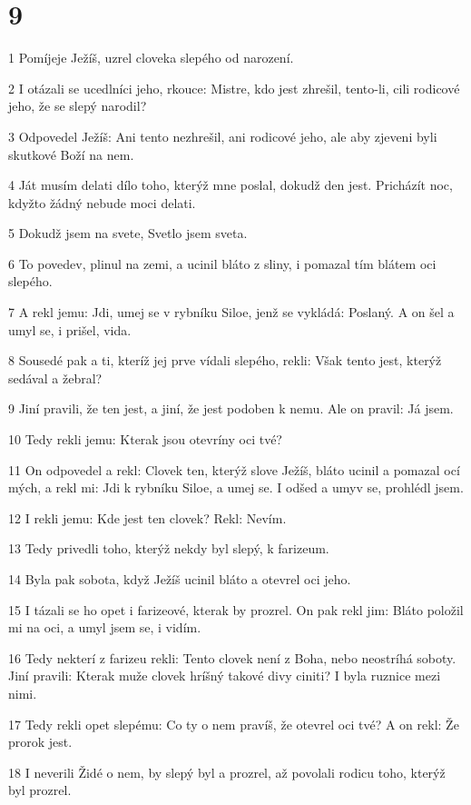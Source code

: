 \chapter{9}

\par 1 Pomíjeje Ježíš, uzrel cloveka slepého od narození.
\par 2 I otázali se ucedlníci jeho, rkouce: Mistre, kdo jest zhrešil, tento-li, cili rodicové jeho, že se slepý narodil?
\par 3 Odpovedel Ježíš: Ani tento nezhrešil, ani rodicové jeho, ale aby zjeveni byli skutkové Boží na nem.
\par 4 Ját musím delati dílo toho, kterýž mne poslal, dokudž den jest. Pricházít noc, kdyžto žádný nebude moci delati.
\par 5 Dokudž jsem na svete, Svetlo jsem sveta.
\par 6 To povedev, plinul na zemi, a ucinil bláto z sliny, i pomazal tím blátem oci slepého.
\par 7 A rekl jemu: Jdi, umej se v rybníku Siloe, jenž se vykládá: Poslaný. A on šel a umyl se, i prišel, vida.
\par 8 Sousedé pak a ti, kteríž jej prve vídali slepého, rekli: Však tento jest, kterýž sedával a žebral?
\par 9 Jiní pravili, že ten jest, a jiní, že jest podoben k nemu. Ale on pravil: Já jsem.
\par 10 Tedy rekli jemu: Kterak jsou otevríny oci tvé?
\par 11 On odpovedel a rekl: Clovek ten, kterýž slove Ježíš, bláto ucinil a pomazal ocí mých, a rekl mi: Jdi k rybníku Siloe, a umej se. I odšed a umyv se, prohlédl jsem.
\par 12 I rekli jemu: Kde jest ten clovek? Rekl: Nevím.
\par 13 Tedy privedli toho, kterýž nekdy byl slepý, k farizeum.
\par 14 Byla pak sobota, když Ježíš ucinil bláto a otevrel oci jeho.
\par 15 I tázali se ho opet i farizeové, kterak by prozrel. On pak rekl jim: Bláto položil mi na oci, a umyl jsem se, i vidím.
\par 16 Tedy nekterí z farizeu rekli: Tento clovek není z Boha, nebo neostríhá soboty. Jiní pravili: Kterak muže clovek hríšný takové divy ciniti? I byla ruznice mezi nimi.
\par 17 Tedy rekli opet slepému: Co ty o nem pravíš, že otevrel oci tvé? A on rekl: Že prorok jest.
\par 18 I neverili Židé o nem, by slepý byl a prozrel, až povolali rodicu toho, kterýž byl prozrel.

